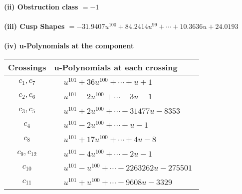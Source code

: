\documentclass[1p]{elsarticle_modified}
\theoremstyle{definition}
\begin{document}
\flushleft \textbf{(ii) Obstruction class $= -1$}\\~\\
\flushleft \textbf{(iii) Cusp Shapes $= -31.9407 u^{100}+84.2414 u^{99}+\cdots+10.3636 u+24.0193$}\\~\\
\newpage\renewcommand{\arraystretch}{1}
\flushleft \textbf{(iv) u-Polynomials at the component}\newline \\
\begin{tabular}{m{50pt}|m{274pt}}
Crossings & \hspace{64pt}u-Polynomials at each crossing \\
\hline $$\begin{aligned}c_{1},c_{7}\end{aligned}$$&$\begin{aligned}
&u^{101}+36 u^{100}+\cdots+u+1
\end{aligned}$\\
\hline $$\begin{aligned}c_{2},c_{6}\end{aligned}$$&$\begin{aligned}
&u^{101}-2 u^{100}+\cdots-3 u-1
\end{aligned}$\\
\hline $$\begin{aligned}c_{3},c_{5}\end{aligned}$$&$\begin{aligned}
&u^{101}+2 u^{100}+\cdots-31477 u-8353
\end{aligned}$\\
\hline $$\begin{aligned}c_{4}\end{aligned}$$&$\begin{aligned}
&u^{101}-2 u^{100}+\cdots+u-1
\end{aligned}$\\
\hline $$\begin{aligned}c_{8}\end{aligned}$$&$\begin{aligned}
&u^{101}+17 u^{100}+\cdots+4 u-8
\end{aligned}$\\
\hline $$\begin{aligned}c_{9},c_{12}\end{aligned}$$&$\begin{aligned}
&u^{101}-4 u^{100}+\cdots-2 u-1
\end{aligned}$\\
\hline $$\begin{aligned}c_{10}\end{aligned}$$&$\begin{aligned}
&u^{101}- u^{100}+\cdots-2263262 u-275501
\end{aligned}$\\
\hline $$\begin{aligned}c_{11}\end{aligned}$$&$\begin{aligned}
&u^{101}+u^{100}+\cdots-9608 u-3329
\end{aligned}$\\
\hline
\end{tabular}\\~\\
\end{document}
